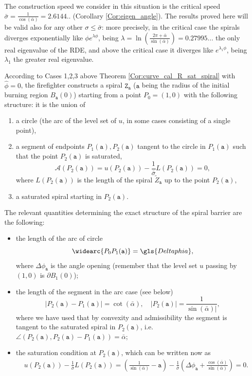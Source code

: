 \documentclass[reqno]{amsart}
\theoremstyle{definition} \newtheorem{definition}{Definition}[section]
\theoremstyle{definition} \newtheorem{remark}[definition]{Remark}
\theoremstyle{plain} \newtheorem{lemma}[definition]{Lemma}
\theoremstyle{plain} \newtheorem{proposition}[definition]{Proposition}
\theoremstyle{plain} \newtheorem{theorem}[definition]{Theorem}
\theoremstyle{plain} \newtheorem{corollary}[definition]{Corollary}
\theoremstyle{definition} \newtheorem{example}[definition]{Example}
\theoremstyle{plain} \newtheorem{claim}[clai]{Claim}
\theoremstyle{definition} \newtheorem{assumption}[definition]{Assumption}
\theoremstyle{definition} \newtheorem{observation}[definition]{Observation}
\newcommand{\1}{\mathbbm 1}
\numberwithin{equation}{section} %
\theoremstyle{plain} \newtheorem*{theorem*}{Theorem}
\theoremstyle{plain} \newtheorem{mthm}[maintheorem]{Main Theorem}
\theoremstyle{plain} \newtheorem*{mthm*}{Main Theorem}
\theoremstyle{plain} \newtheorem*{conjecture*}{Conjecture}
\theoremstyle{plain} \newtheorem{conjecture}[definition]{Conjecture}
\theoremstyle{plain} \newtheorem*{problem*}{Problem}
\begin{document}
The construction speed we consider in this situation is the critical speed $\bar\sigma = \frac{1}{\cos(\bar \alpha)} = 2.6144..$ (Corollary \ref{Cor:eigen_angle}). The results proved here will be valid also for any other $\sigma \leq \bar\sigma$: more precisely, in the critical case the spirals diverges exponentially like $\phi e^{\lambda \phi}$, being $\lambda = \ln (\frac{2\pi + \bar 
\alpha}{\sin(\bar \alpha)}) = 0.27995...$ the only real eigenvalue of the RDE, and above the critical case it diverges like $e^{\lambda_1 \phi}$, being $\lambda_1$ the greater real eigenvalue. 

According to Cases 1,2,3 above Theorem \ref{Cor:curve_cal_R_sat_spiral} with $\hat \phi = 0$, the firefighter constructs a spiral $\mathtt Z_\mathtt a$ ($\mathtt a$ being the radius of the initial burning region $B_\mathtt a(0)$) starting from a point $P_0 = (1,0)$ with the following structure: it is the union of
\begin{enumerate}
\item a circle (the arc of the level set of $u$, in some cases consisting of a single point),
\item a segment of endpoints $P_1(\mathtt a),P_2(\mathtt a)$ tangent to the circle in $P_1(\mathtt a)$ such that the point $P_2(\mathtt a)$ is saturated,
\begin{equation*}
\mathcal{A}(P_2(\mathtt a)) = u(P_2(\mathtt a)) - \frac{1}{\bar\sigma} L(P_2(\mathtt a)) = 0,
\end{equation*}
where $L(P_2(\mathtt a))$ is the length of the spiral $\tilde Z_{\mathtt a}$ up to the point $P_2(\mathtt a)$,
\item a saturated spiral starting in $P_2(\mathtt a)$.
\end{enumerate}
The relevant quantities determining the exact structure of the spiral barrier are the following:
\begin{itemize}
\item the length of the arc of circle 
$$
\widearc{P_0 P_1(\mathtt a)} = \gls{Deltaphia},
$$
where $\Delta \phi_{\mathtt a}$ is the angle opening (remember that the level set $u$ passing by $(1,0)$ is $\partial B_1(0)$);
\item the length of the segment in the arc case (see below)
$$
|P_2(\mathtt a) - P_1(\mathtt a)| = \cot(\bar\alpha), \quad |P_2(\mathtt a)| = \frac{1}{\sin(\bar \alpha)|},
$$
where we have used that by convexity and admissibility the segment is tangent to the saturated spiral in $P_2(\mathtt a)$, i.e. $\angle(P_2(\mathtt a),P_2(\mathtt a) - P_1(\mathtt a)) = \bar \alpha$;
\item the saturation condition at $P_2(\mathtt a)$, which can be written now as
\begin{align*}
&u(P_2(\mathtt a)) - \frac{1}{\bar \sigma} L(P_2(\mathtt a)) = \left( \frac{1}{\sin(\bar \alpha)} - \mathtt a \right) - \frac{1}{\bar \sigma} \left( \Delta \phi_{\mathtt a} + \frac{\cos(\bar \alpha)}{\sin(\bar \alpha)} \right) = 0.
\end{align*}
\end{itemize}
\end{document}
